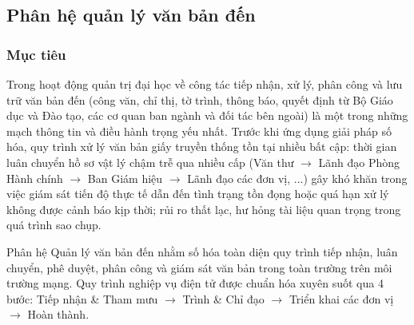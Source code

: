 
\subsection{Phân hệ quản lý văn bản đến}
\label{subsec:incoming_docs}

\subsubsection{Mục tiêu}
Trong hoạt động quản trị đại học về công tác tiếp nhận, xử lý, phân công và lưu trữ văn bản đến (công văn, chỉ thị, tờ trình, thông báo, quyết định từ Bộ Giáo dục và Đào tạo, các cơ quan ban ngành và đối tác bên ngoài) là một trong những mạch thông tin và điều hành trọng yếu nhất. Trước khi ứng dụng giải pháp số hóa, quy trình xử lý văn bản giấy truyền thống tồn tại nhiều bất cập: thời gian luân chuyển hồ sơ vật lý chậm trễ qua nhiều cấp (Văn thư $\rightarrow$ Lãnh đạo Phòng Hành chính $\rightarrow$ Ban Giám hiệu $\rightarrow$ Lãnh đạo các đơn vị, ...) gây khó khăn trong việc giám sát tiến độ thực tế dẫn đến tình trạng tồn đọng hoặc quá hạn xử lý không được cảnh báo kịp thời; rủi ro thất lạc, hư hỏng tài liệu quan trọng trong quá trình sao chụp.

Phân hệ Quản lý văn bản đến nhằm số hóa toàn diện quy trình tiếp nhận, luân chuyển, phê duyệt, phân công và giám sát văn bản trong toàn trường trên môi trường mạng. Quy trình nghiệp vụ điện tử được chuẩn hóa xuyên suốt qua 4 bước: Tiếp nhận \& Tham mưu $\rightarrow$ Trình \& Chỉ đạo $\rightarrow$ Triển khai các đơn vị $\rightarrow$ Hoàn thành.

